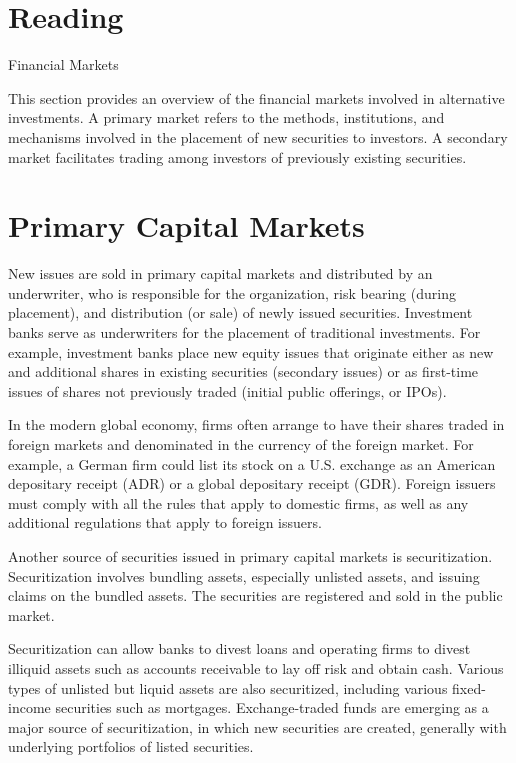 \documentclass[11pt]{article}
\begin{document}
\section*{Reading}
Financial Markets

This section provides an overview of the financial markets involved in alternative investments. A primary market refers to the methods, institutions, and mechanisms involved in the placement of new securities to investors. A secondary market facilitates trading among investors of previously existing securities.

\section*{Primary Capital Markets}
New issues are sold in primary capital markets and distributed by an underwriter, who is responsible for the organization, risk bearing (during placement), and distribution (or sale) of newly issued securities. Investment banks serve as underwriters for the placement of traditional investments. For example, investment banks place new equity issues that originate either as new and additional shares in existing securities (secondary issues) or as first-time issues of shares not previously traded (initial public offerings, or IPOs).

In the modern global economy, firms often arrange to have their shares traded in foreign markets and denominated in the currency of the foreign market. For example, a German firm could list its stock on a U.S. exchange as an American depositary receipt (ADR) or a global depositary receipt (GDR). Foreign issuers must comply with all the rules that apply to domestic firms, as well as any additional regulations that apply to foreign issuers.

Another source of securities issued in primary capital markets is securitization. Securitization involves bundling assets, especially unlisted assets, and issuing claims on the bundled assets. The securities are registered and sold in the public market.

Securitization can allow banks to divest loans and operating firms to divest illiquid assets such as accounts receivable to lay off risk and obtain cash. Various types of unlisted but liquid assets are also securitized, including various fixed-income securities such as mortgages. Exchange-traded funds are emerging as a major source of securitization, in which new securities are created, generally with underlying portfolios of listed securities.
\end{document}
